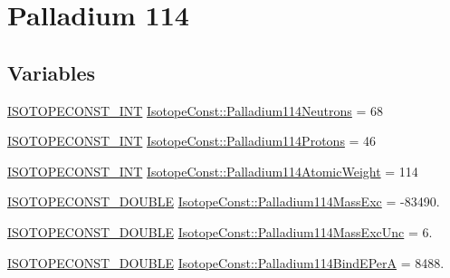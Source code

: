 \hypertarget{group___isotope_const-_palladium-_pd114}{}\section{Palladium 114}
\label{group___isotope_const-_palladium-_pd114}
\subsection*{Variables}
\begin{DoxyCompactItemize}
\item 
\mbox{\hyperlink{group___isotope_const-_macros_ga5f18360b3e99483a35c32d789e62621c}{I\+S\+O\+T\+O\+P\+E\+C\+O\+N\+S\+T\+\_\+\+I\+NT}} \mbox{\hyperlink{group___isotope_const-_palladium-_pd114_gacd0ad19ac27cf9193d807eb748445ed2}{Isotope\+Const\+::\+Palladium114\+Neutrons}} = 68
\item 
\mbox{\hyperlink{group___isotope_const-_macros_ga5f18360b3e99483a35c32d789e62621c}{I\+S\+O\+T\+O\+P\+E\+C\+O\+N\+S\+T\+\_\+\+I\+NT}} \mbox{\hyperlink{group___isotope_const-_palladium-_pd114_ga0086014f2bb0573d81ff668c0afc71af}{Isotope\+Const\+::\+Palladium114\+Protons}} = 46
\item 
\mbox{\hyperlink{group___isotope_const-_macros_ga5f18360b3e99483a35c32d789e62621c}{I\+S\+O\+T\+O\+P\+E\+C\+O\+N\+S\+T\+\_\+\+I\+NT}} \mbox{\hyperlink{group___isotope_const-_palladium-_pd114_gafc3263de0b793a142391cb0592be9fb5}{Isotope\+Const\+::\+Palladium114\+Atomic\+Weight}} = 114
\item 
\mbox{\hyperlink{group___isotope_const-_macros_ga8f45a7272ce02c0b4c65c44636ed719a}{I\+S\+O\+T\+O\+P\+E\+C\+O\+N\+S\+T\+\_\+\+D\+O\+U\+B\+LE}} \mbox{\hyperlink{group___isotope_const-_palladium-_pd114_ga6ade9f5f05a2524d764afbdb820a155b}{Isotope\+Const\+::\+Palladium114\+Mass\+Exc}} = -\/83490.
\item 
\mbox{\hyperlink{group___isotope_const-_macros_ga8f45a7272ce02c0b4c65c44636ed719a}{I\+S\+O\+T\+O\+P\+E\+C\+O\+N\+S\+T\+\_\+\+D\+O\+U\+B\+LE}} \mbox{\hyperlink{group___isotope_const-_palladium-_pd114_ga8cd0c5f7dfa7225b3e784614b3f843f4}{Isotope\+Const\+::\+Palladium114\+Mass\+Exc\+Unc}} = 6.
\item 
\mbox{\hyperlink{group___isotope_const-_macros_ga8f45a7272ce02c0b4c65c44636ed719a}{I\+S\+O\+T\+O\+P\+E\+C\+O\+N\+S\+T\+\_\+\+D\+O\+U\+B\+LE}} \mbox{\hyperlink{group___isotope_const-_palladium-_pd114_ga55c45977a0fed59163f0f53c67ed796d}{Isotope\+Const\+::\+Palladium114\+Bind\+E\+PerA}} = 8488.
\item 

\end{DoxyCompactItemize}
